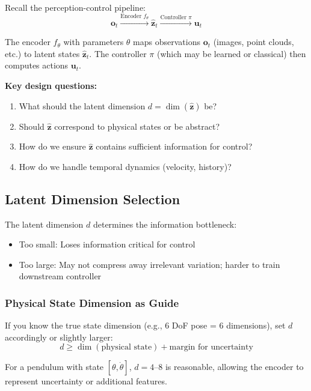 Recall the perception-control pipeline:
\begin{equation}
\mathbf{o}_t \xrightarrow{\text{Encoder } f_\theta} \hat{\mathbf{z}}_t \xrightarrow{\text{Controller } \pi} \mathbf{u}_t
\label{eq:encoder_pipeline}
\end{equation}

The encoder $f_\theta$ with parameters $\theta$ maps observations $\mathbf{o}_t$ (images, point clouds, etc.) to latent states $\hat{\mathbf{z}}_t$. The controller $\pi$ (which may be learned or classical) then computes actions $\mathbf{u}_t$.

\textbf{Key design questions:}
\begin{enumerate}
    \item What should the latent dimension $d = \dim(\hat{\mathbf{z}})$ be?
    \item Should $\hat{\mathbf{z}}$ correspond to physical states or be abstract?
    \item How do we ensure $\hat{\mathbf{z}}$ contains sufficient information for control?
    \item How do we handle temporal dynamics (velocity, history)?
\end{enumerate}

\subsection{Latent Dimension Selection}

The latent dimension $d$ determines the information bottleneck:
\begin{itemize}
    \item Too small: Loses information critical for control
    \item Too large: May not compress away irrelevant variation; harder to train downstream controller
\end{itemize}

\subsubsection{Physical State Dimension as Guide}

If you know the true state dimension (e.g., 6 DoF pose = 6 dimensions), set $d$ accordingly or slightly larger:
\begin{equation}
d \geq \dim(\text{physical state}) + \text{margin for uncertainty}
\end{equation}

For a pendulum with state $[\theta, \dot{\theta}]$, $d = 4$--$8$ is reasonable, allowing the encoder to represent uncertainty or additional features.

